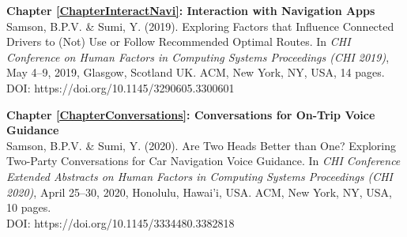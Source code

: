 \large \textbf{Chapter \ref{ChapterInteractNavi}: Interaction with Navigation Apps} \normalsize \\
\vspace*{5pt}
\noindent [1] Samson, B.P.V. \& Sumi, Y. (2019). Exploring Factors that Influence Connected Drivers to (Not) Use or Follow Recommended Optimal Routes. In \textit{CHI Conference on Human Factors in Computing Systems Proceedings (CHI 2019)}, May 4–9, 2019, Glasgow, Scotland UK. ACM, New York, NY, USA, 14 pages. \\ 
\noindent DOI: https://doi.org/10.1145/3290605.3300601

\vspace*{15pt}

\noindent \large \textbf{Chapter \ref{ChapterConversations}: Conversations for On-Trip Voice Guidance} \normalsize \\
\vspace*{5pt}
\noindent [2] Samson, B.P.V. \& Sumi, Y. (2020). Are Two Heads Better than One? Exploring Two-Party Conversations for Car Navigation Voice Guidance. In \textit{CHI Conference Extended Abstracts on Human Factors in Computing Systems Proceedings (CHI 2020)}, April 25–30, 2020, Honolulu, Hawai'i, USA. ACM, New York, NY, USA, 10 pages. \\ 
\noindent DOI: https://doi.org/10.1145/3334480.3382818